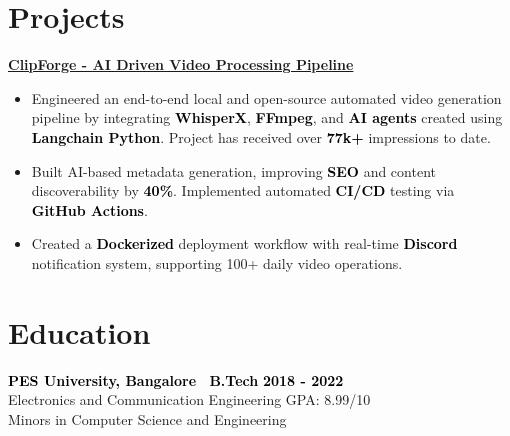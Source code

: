 \documentclass[a4paper,10pt]{article}
\newcommand{\bb}[1]{\textcolor{black}{\textbf{#1}}}
\begin{document}
\section{Projects}
\bb{\href{https://github.com/rajathjn/shorts_maker}{ClipForge - AI Driven Video Processing Pipeline}}
\smallskip
\begin{itemize}[nosep, leftmargin=2em, itemsep=3pt]
    \item Engineered an end-to-end local and open-source automated video generation pipeline by integrating \bb{WhisperX}, \bb{FFmpeg}, and \bb{AI agents} created using \bb{Langchain Python}. Project has received over \bb{77k+} impressions to date.
    \item Built AI-based metadata generation, improving \bb{SEO} and content discoverability by \bb{40\%}. Implemented automated \bb{CI/CD} testing via \bb{GitHub Actions}.
    \item Created a \bb{Dockerized} deployment workflow with real-time \bb{Discord} notification system, supporting 100+ daily video operations.
\end{itemize}
\vspace{-1em}
%
%
\section{Education}
\bb{PES University, Bangalore \textbar\ B.Tech} \hfill \bb{2018 - 2022} \\
Electronics and Communication Engineering \hfill GPA: 8.99/10 \\
Minors in Computer Science and Engineering
\end{document}
